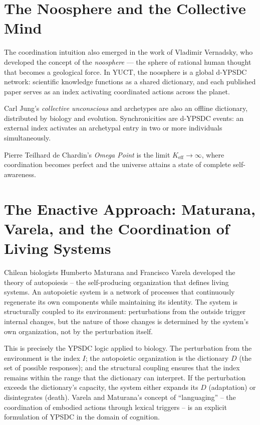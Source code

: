 \documentclass[12pt,a4paper]{article}
\begin{document}
	\section{The Noosphere and the Collective Mind}
	
	The coordination intuition also emerged in the work of Vladimir Vernadsky, who developed the concept of the \emph{noosphere} --- the sphere of rational human thought that becomes a geological force. In YUCT, the noosphere is a global d-YPSDC network: scientific knowledge functions as a shared dictionary, and each published paper serves as an index activating coordinated actions across the planet.
	
	Carl Jung's \emph{collective unconscious} and archetypes are also an offline dictionary, distributed by biology and evolution. Synchronicities are d-YPSDC events: an external index activates an archetypal entry in two or more individuals simultaneously.
	
	Pierre Teilhard de Chardin's \emph{Omega Point} is the limit \(K_{\mathrm{eff}} \to \infty\), where coordination becomes perfect and the universe attains a state of complete self-awareness.
	
	\section{The Enactive Approach: Maturana, Varela, and the Coordination of Living Systems}
	
	Chilean biologists Humberto Maturana and Francisco Varela developed the theory of autopoiesis -- the self-producing organization that defines living systems. An autopoietic system is a network of processes that continuously regenerate its own components while maintaining its identity. The system is structurally coupled to its environment: perturbations from the outside trigger internal changes, but the nature of those changes is determined by the system's own organization, not by the perturbation itself.
	
	This is precisely the YPSDC logic applied to biology. The perturbation from the environment is the index \(I\); the autopoietic organization is the dictionary \(D\) (the set of possible responses); and the structural coupling ensures that the index remains within the range that the dictionary can interpret. If the perturbation exceeds the dictionary's capacity, the system either expands its \(D\) (adaptation) or disintegrates (death). Varela and Maturana's concept of ``languaging'' -- the coordination of embodied actions through lexical triggers -- is an explicit formulation of YPSDC in the domain of cognition.
	
\end{document}
